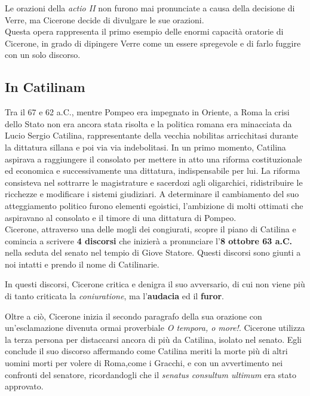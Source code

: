 \documentclass[10pt,a4paper]{article}
\begin{document}
Le orazioni della \textit{actio II} non furono mai pronunciate a causa della decisione di Verre, ma Cicerone decide di divulgare le sue orazioni. \\

Questa opera rappresenta il primo esempio delle enormi capacità oratorie di Cicerone, in grado di dipingere Verre come un essere spregevole e di farlo fuggire con un solo discorso. 

\subsection*{In Catilinam}

Tra il 67 e 62 a.C., mentre Pompeo era impegnato in Oriente, a Roma la crisi dello Stato non era ancora stata risolta e la politica romana era minacciata da Lucio Sergio Catilina, rappresentante della vecchia nobilitas arricchitasi durante la dittatura sillana e poi via via indebolitasi. In un primo momento, Catilina aspirava a raggiungere il consolato per mettere in atto una riforma costituzionale ed economica e successivamente una dittatura, indispensabile per lui. La riforma consisteva nel sottrarre le magistrature e sacerdozi agli oligarchici, ridistribuire le ricchezze e modificare i sistemi giudiziari. A determinare il cambiamento del suo atteggiamento politico furono elementi egoistici, l'ambizione di molti ottimati che aspiravano al consolato e il timore di una dittatura di Pompeo.\\

Cicerone, attraverso una delle mogli dei congiurati, scopre il piano di Catilina e comincia a scrivere \textbf{4 discorsi} che inizierà a pronunciare l'\textbf{8 ottobre 63 a.C.} nella seduta del senato nel tempio di Giove Statore. Questi discorsi sono giunti a noi intatti e prendo il nome di Catilinarie.

In questi discorsi, Cicerone critica e denigra il suo avversario, di cui non viene più di tanto criticata la \textit{coniuratione}, ma l'\textbf{audacia} ed il \textbf{furor}.

Oltre a ciò, Cicerone inizia il secondo paragrafo della sua orazione con un'esclamazione divenuta ormai proverbiale \textit{O tempora, o more!}. Cicerone utilizza la terza persona per distaccarsi ancora di più da Catilina, isolato nel senato. Egli conclude il suo discorso affermando come Catilina meriti la morte più di altri uomini morti per volere di Roma,come i Gracchi, e con un avvertimento nei confronti del senatore, ricordandogli che il \textit{senatus consultum ultimum} era stato approvato.
\end{document}
